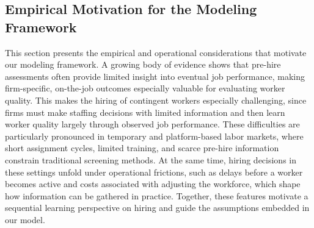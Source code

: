 \documentclass[opre,blindrev]{informs3}
\begin{document}
\subsection{Empirical Motivation for the Modeling Framework}\label{sec:hiring-background}
This section presents the empirical and operational considerations that motivate our modeling framework. A growing body of evidence shows that pre-hire assessments often provide limited insight into eventual job performance, making firm-specific, on-the-job outcomes especially valuable for evaluating worker quality. This makes the hiring of contingent workers especially challenging, since firms must make staffing decisions with limited information and then learn worker quality largely through observed job performance. These difficulties are particularly pronounced in temporary and platform-based labor markets, where short assignment cycles, limited training, and scarce pre-hire information constrain traditional screening methods. At the same time, hiring decisions in these settings unfold under operational frictions, such as delays before a worker becomes active and costs associated with adjusting the workforce, which shape how information can be gathered in practice. Together, these features motivate a sequential learning perspective on hiring and guide the assumptions embedded in our model.
\end{document}
